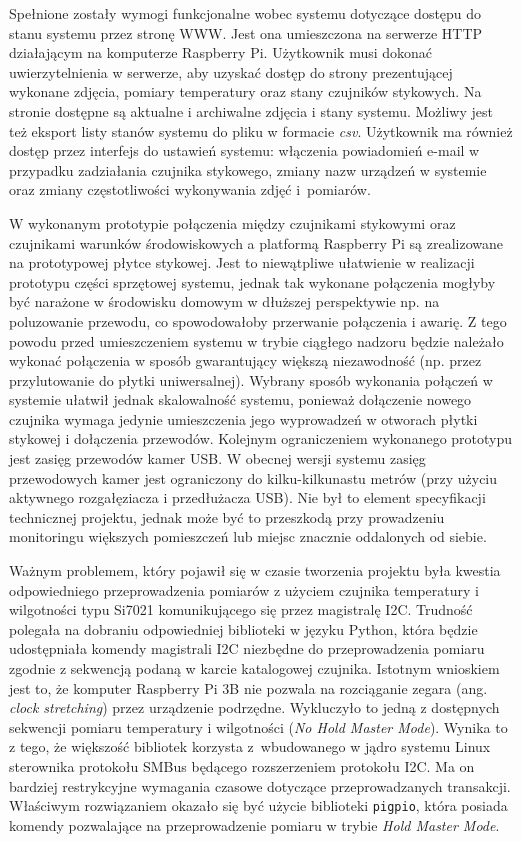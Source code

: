 \documentclass[a4paper,11pt,twoside]{article}
\begin{document}
Spełnione zostały wymogi funkcjonalne wobec systemu dotyczące dostępu do stanu systemu przez stronę WWW. Jest ona umieszczona na serwerze HTTP działającym na komputerze Raspberry Pi. Użytkownik musi dokonać uwierzytelnienia w serwerze, aby uzyskać dostęp do strony prezentującej wykonane zdjęcia, pomiary temperatury oraz stany czujników stykowych. Na stronie dostępne są aktualne i archiwalne zdjęcia i stany systemu. Możliwy jest też eksport listy stanów systemu do pliku w formacie \textit{csv}. Użytkownik ma również dostęp przez interfejs do ustawień systemu: włączenia powiadomień e-mail w przypadku zadziałania czujnika stykowego, zmiany nazw urządzeń w systemie oraz zmiany częstotliwości wykonywania zdjęć i~pomiarów.

W wykonanym prototypie połączenia między czujnikami stykowymi oraz czujnikami warunków środowiskowych a platformą Raspberry Pi są zrealizowane na prototypowej płytce stykowej. Jest to niewątpliwe ułatwienie w realizacji prototypu części sprzętowej systemu, jednak tak wykonane połączenia mogłyby być narażone w środowisku domowym w dłuższej perspektywie np. na poluzowanie przewodu, co spowodowałoby przerwanie połączenia i awarię. Z tego powodu przed umieszczeniem systemu w trybie ciągłego nadzoru będzie należało wykonać połączenia w sposób gwarantujący większą niezawodność (np. przez przylutowanie do płytki uniwersalnej). Wybrany sposób wykonania połączeń w systemie ułatwił jednak skalowalność systemu, ponieważ dołączenie nowego czujnika wymaga jedynie umieszczenia jego wyprowadzeń w otworach płytki stykowej i dołączenia przewodów. Kolejnym ograniczeniem wykonanego prototypu jest zasięg przewodów kamer USB. W obecnej wersji systemu zasięg przewodowych kamer jest ograniczony do kilku-kilkunastu metrów (przy użyciu aktywnego rozgałęziacza i przedłużacza USB). Nie był to element specyfikacji technicznej projektu, jednak może być to przeszkodą przy prowadzeniu monitoringu większych pomieszczeń lub miejsc znacznie oddalonych od siebie.

Ważnym problemem, który pojawił się w czasie tworzenia projektu była kwestia odpowiedniego przeprowadzenia pomiarów z użyciem czujnika temperatury i wilgotności typu Si7021 komunikującego się przez magistralę I2C. Trudność polegała na dobraniu odpowiedniej biblioteki w języku Python, która będzie udostępniała komendy magistrali I2C niezbędne do przeprowadzenia pomiaru zgodnie z sekwencją podaną w karcie katalogowej czujnika. Istotnym wnioskiem jest to, że komputer Raspberry Pi 3B nie pozwala na rozciąganie zegara (ang. \textit{clock stretching}) przez urządzenie podrzędne. Wykluczyło to jedną z dostępnych sekwencji pomiaru temperatury i wilgotności (\textit{No Hold Master Mode}). Wynika to z tego, że większość bibliotek korzysta z~wbudowanego w jądro systemu Linux sterownika protokołu SMBus będącego rozszerzeniem protokołu I2C. Ma on bardziej restrykcyjne wymagania czasowe dotyczące przeprowadzanych transakcji. Właściwym rozwiązaniem okazało się być użycie biblioteki \texttt{pigpio}, która posiada komendy pozwalające na przeprowadzenie pomiaru w trybie \textit{Hold Master Mode}.
\end{document}
